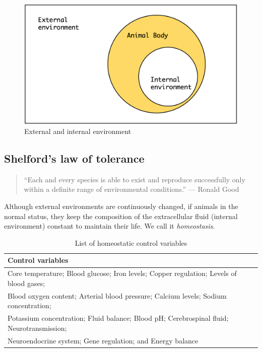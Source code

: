 \documentclass[]{book}
\begin{document}
\begin{figure}

{\centering \includegraphics[width=0.6\linewidth]{figures/animal-env} 

}

\caption{External and internal environment}\label{fig:ext-int-env}
\end{figure}

\subsection{Shelford's law of
tolerance}\label{shelfords-law-of-tolerance}

\begin{quote}
``Each and every species is able to exist and reproduce successfully
only within a definite range of environmental conditions.'' --- Ronald
Good
\end{quote}

Although external environments are continuously changed, if animals in
the normal status, they keep the composition of the extracellular fluid
(internal environment) constant to maintain their life. We call it
\emph{homeostasis}.

\begin{table}[t]

\caption{\label{tab:homeostasis}List of homeostatic control variables}
\centering
\begin{tabular}{l}
\toprule
Control variables\\
\midrule
Core temperature; Blood glucose; Iron levels; Copper regulation; Levels of blood gases;\\
Blood oxygen content; Arterial blood pressure; Calcium levels; Sodium concentration;\\
Potassium concentration; Fluid balance; Blood pH; Cerebrospinal fluid; Neurotransmission;\\
Neuroendocrine system; Gene regulation; and Energy balance\\
\bottomrule
\end{tabular}
\end{table}
\end{document}
